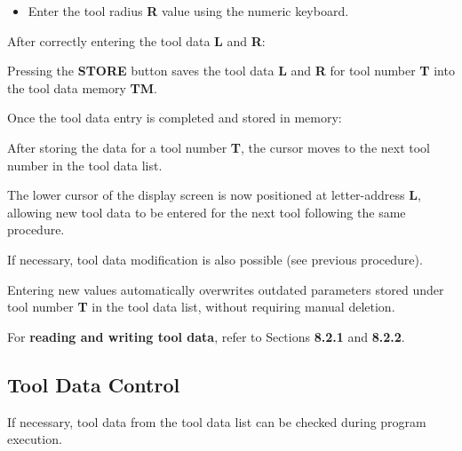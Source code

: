 \begin{itemize}
    \item Enter the tool radius \textbf{R} value using the numeric keyboard.
\end{itemize}

\vspace{.5cm}
After correctly entering the tool data \textbf{L} and \textbf{R}:

\begin{itemize}
\end{itemize}

\vspace{.5cm}

Pressing the \textbf{STORE} button saves the tool data \textbf{L} and \textbf{R} for tool number \textbf{T} into the tool data memory \textbf{TM}.

\newpage

Once the tool data entry is completed and stored in memory:

\begin{itemize}
\end{itemize}

\vspace{.5cm}

\notes

After storing the data for a tool number \textbf{T}, the cursor moves to the next tool number in the tool data list.

The lower cursor of the display screen is now positioned at letter-address \textbf{L}, allowing new tool data to be entered for the next tool following the same procedure.

If necessary, tool data modification is also possible (see previous procedure).

Entering new values automatically overwrites outdated parameters stored under tool number \textbf{T} in the tool data list, without requiring manual deletion.

For \textbf{reading and writing tool data}, refer to Sections \textbf{8.2.1} and \textbf{8.2.2}.

\subsection{Tool Data Control}

If necessary, tool data from the tool data list can be checked during program execution.

